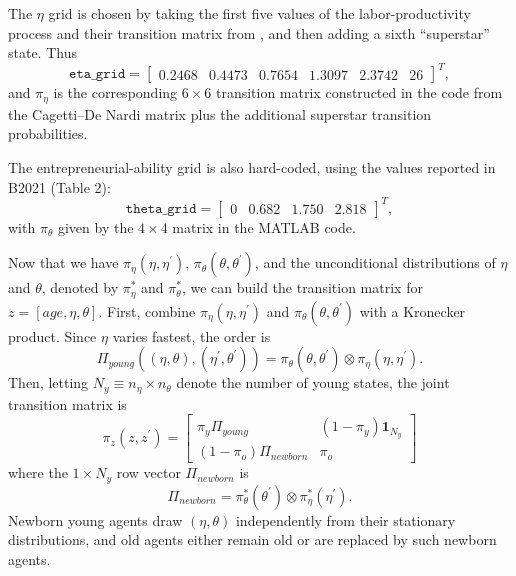 \documentclass[11pt,fleqn]{article}
\begin{document}
The $\eta$ grid is chosen by taking the first five values of the labor-productivity process and their transition matrix from \citep{CagettiDeNardi2009}, and then adding a sixth ``superstar'' state. Thus
\begin{equation*}
	\mathtt{eta\_grid}
	=
	\begin{bmatrix}
		0.2468 & 0.4473 & 0.7654 & 1.3097 & 2.3742 & 26
	\end{bmatrix}^{T},
\end{equation*}%
and $\pi_{\eta}$ is the corresponding $6\times 6$ transition matrix constructed in the code from the Cagetti--De Nardi matrix plus the additional superstar transition probabilities.

The entrepreneurial-ability grid is also hard-coded, using the values reported in B2021 (Table 2):
\begin{equation*}
	\mathtt{theta\_grid}
	=
	\begin{bmatrix}
		0 & 0.682 & 1.750 & 2.818
	\end{bmatrix}^{T},
\end{equation*}%
with $\pi_{\theta}$ given by the $4\times 4$ matrix in the MATLAB code.

Now that we have $\pi _{\eta }(\eta ,\eta^{\prime })$, $\pi _{\theta }(\theta ,\theta ^{\prime })$, and the unconditional distributions of $\eta$ and $\theta$, denoted by $\pi_{\eta }^{\ast }$ and $\pi _{\theta }^{\ast }$, we can build the transition matrix for $z=[age,\eta,\theta]$. First, combine $\pi _{\eta }(\eta ,\eta ^{\prime })$ and $\pi _{\theta }(\theta ,\theta ^{\prime })$ with a Kronecker product. Since $\eta$ varies fastest, the order is
\begin{equation*}
	\Pi _{young}(\left( \eta ,\theta \right) ,\left( \eta ^{\prime
	},\theta ^{\prime }\right) )= \pi _{\theta }(\theta ,\theta
	^{\prime }) \otimes \pi _{\eta }(\eta ,\eta ^{\prime }).
\end{equation*}%
Then, letting $N_{y}\equiv n_{\eta} \times n_{\theta}$ denote the number of young states, the joint transition matrix is
\begin{equation*}
	\pi _{z}(z,z^{\prime })=%
	\begin{bmatrix}
		\pi_y \Pi _{young} & (1-\pi_y)\mathbf{1}_{N_{y}} \\ 
		(1-\pi_o)\Pi _{newborn} & \pi_o%
	\end{bmatrix}%
\end{equation*}%
where the $1\times N_{y}$ row vector $\Pi _{newborn}$ is
\begin{equation*}
	\Pi _{newborn}=\pi _{\theta }^{\ast }(\theta ^{\prime }) \otimes \pi
	_{\eta }^{\ast }\left( \eta ^{\prime }\right) .
\end{equation*}%
Newborn young agents draw $(\eta,\theta)$ independently from their stationary distributions, and old agents either remain old or are replaced by such newborn agents.
\end{document}
